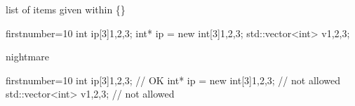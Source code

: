 \begin{frame}[fragile]
  \begin{exampleblock}{list of items given within \{\}}
    \begin{cppcode*}{firstnumber=10}
     int ip[3]{1,2,3};
     int* ip = new int[3]{1,2,3};
     std::vector<int> v{1,2,3};
    \end{cppcode*}
  \end{exampleblock}
  \pause
  \begin{block}{ nightmare}
    \begin{cppcode*}{firstnumber=10}
     int ip[3]{1,2,3};            // OK
     int* ip = new int[3]{1,2,3}; // not allowed
     std::vector<int> v{1,2,3};   // not allowed
    \end{cppcode*}
  \end{block}
\end{frame}

